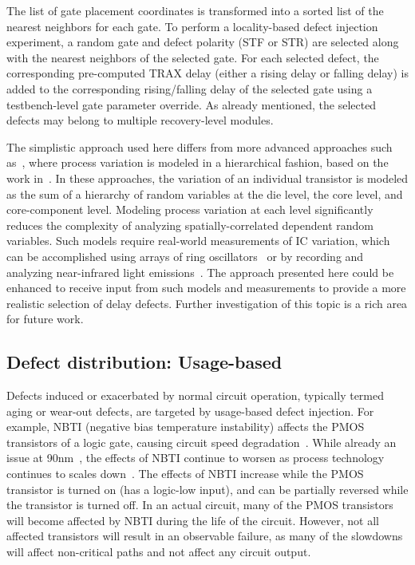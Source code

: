 The list of gate placement coordinates is transformed into a sorted list of the nearest neighbors for each gate.
%
To perform a locality-based defect injection experiment, a random gate and defect polarity (STF or STR) are selected along with the nearest neighbors of the selected gate.
%
For each selected defect, the corresponding pre-computed TRAX delay (either a rising delay or falling delay) is added to the corresponding rising/falling delay of the selected gate using a testbench-level gate parameter override.
%
As already mentioned, the selected defects may belong to multiple recovery-level modules.

The simplistic approach used here differs from more advanced approaches such as~\cite{cai16}, where process variation is modeled in a hierarchical fashion, based on the work in~\cite{xiong07}.
%
In these approaches, the variation of an individual transistor is modeled as the sum of a hierarchy of random variables at the die level, the core level, and core-component level.
%
Modeling process variation at each level significantly reduces the complexity of analyzing spatially-correlated dependent random variables.
%
Such models require real-world measurements of IC variation, which can be accomplished using arrays of ring oscillators~\cite{bushan06} or by recording and analyzing near-infrared light emissions~\cite{stellari09}.
%
The approach presented here could be enhanced to receive input from such models and measurements to provide a more realistic selection of delay defects.
%
Further investigation of this topic is a rich area for future work.

\subsection{Defect distribution: Usage-based}
Defects induced or exacerbated by normal circuit operation, typically termed aging or wear-out defects, are targeted by usage-based defect injection.
%
For example, NBTI (negative bias temperature instability) affects the PMOS transistors of a logic gate, causing circuit speed degradation~\cite{borkar06, schroder03}.
%
While already an issue at 90nm~\cite{agarwal07}, the effects of NBTI continue to worsen as process technology continues to scales down~\cite{reddy02}.
%
The effects of NBTI increase while the PMOS transistor is turned on (has a logic-low input), and can be partially reversed while the transistor is turned off.
%
In an actual circuit, many of the PMOS transistors will become affected by NBTI during the life of the circuit.
%
However, not all affected transistors will result in an observable failure, as many of the slowdowns will affect non-critical paths and not affect any circuit output.

